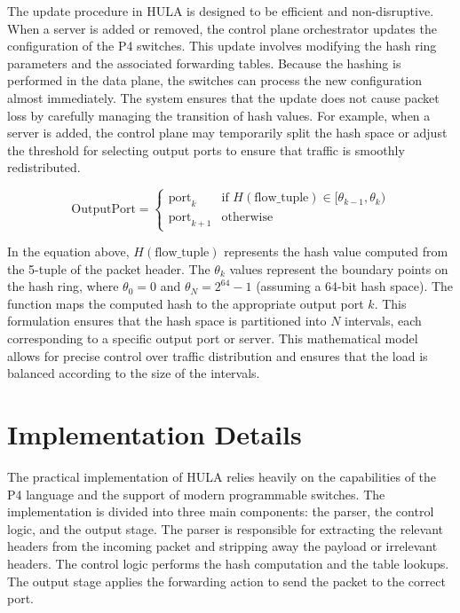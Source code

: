 \documentclass[12pt,a4paper]{article}
\begin{document}
The update procedure in HULA is designed to be efficient and non-disruptive. When a server is added or removed, the control plane orchestrator updates the configuration of the P4 switches. This update involves modifying the hash ring parameters and the associated forwarding tables. Because the hashing is performed in the data plane, the switches can process the new configuration almost immediately. The system ensures that the update does not cause packet loss by carefully managing the transition of hash values. For example, when a server is added, the control plane may temporarily split the hash space or adjust the threshold for selecting output ports to ensure that traffic is smoothly redistributed.

\begin{equation}
  \text{OutputPort} = \begin{cases} 
    \text{port}_k & \text{if } H(\text{flow\_tuple}) \in [\theta_{k-1}, \theta_k) \\
    \text{port}_{k+1} & \text{otherwise}
  \end{cases}
\end{equation}

In the equation above, $H(\text{flow\_tuple})$ represents the hash value computed from the 5-tuple of the packet header. The $\theta_k$ values represent the boundary points on the hash ring, where $\theta_0 = 0$ and $\theta_N = 2^{64}-1$ (assuming a 64-bit hash space). The function maps the computed hash to the appropriate output port $k$. This formulation ensures that the hash space is partitioned into $N$ intervals, each corresponding to a specific output port or server. This mathematical model allows for precise control over traffic distribution and ensures that the load is balanced according to the size of the intervals.

\section{Implementation Details}

The practical implementation of HULA relies heavily on the capabilities of the P4 language and the support of modern programmable switches. The implementation is divided into three main components: the parser, the control logic, and the output stage. The parser is responsible for extracting the relevant headers from the incoming packet and stripping away the payload or irrelevant headers. The control logic performs the hash computation and the table lookups. The output stage applies the forwarding action to send the packet to the correct port.
\end{document}

